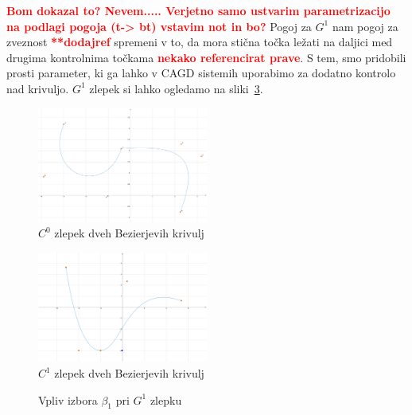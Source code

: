 \documentclass[isrm2, tisk]{fmfdelo}
\newcommand{\mycomment}[1]{\textbf{\textcolor{red}{#1}}}
\begin{document}
    \mycomment{Bom dokazal to? Nevem..... Verjetno samo ustvarim parametrizacijo na podlagi pogoja (t-> bt) vstavim not in bo?}
    Pogoj za $G^1$ nam pogoj za zveznost \mycomment{**dodajref} spremeni v to, da mora stična točka ležati na daljici med drugima kontrolnima točkama \mycomment{nekako referencirat prave}.
    S tem, smo pridobili prosti parameter, ki ga lahko v CAGD sistemih uporabimo za dodatno kontrolo nad krivuljo.
    $G^1$ zlepek si lahko ogledamo na sliki~\ref{fig:zlepek-g1}.
    \begin{figure}[h]
        \centering
        \includegraphics[width = 0.50\textwidth]{images/zlepek-c0}
        \caption{$C^0$ zlepek dveh Bezierjevih krivulj}
        \label{fig:zlepek-c0}
    \end{figure}
    \begin{figure}[h]
        \centering
        \includegraphics[width = 0.50\textwidth]{images/zlepek-c1}
        \caption{$C^1$ zlepek dveh Bezierjevih krivulj}
        \label{fig:zlepek-c1}
    \end{figure}
    \begin{figure}[h]
        \centering
        \qquad
        \caption{Vpliv izbora $\beta_1$ pri $G^1$ zlepku}
        \label{fig:zlepek-g1}
    \end{figure}
\end{document}
